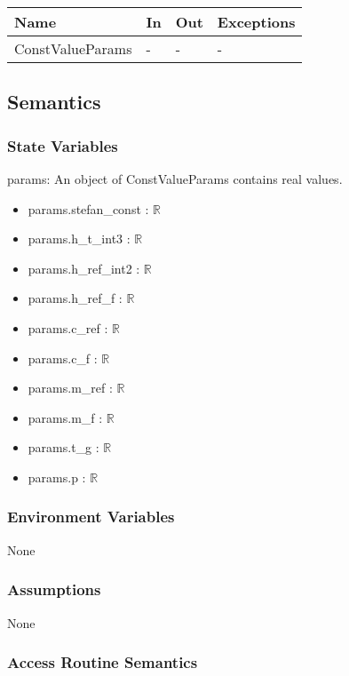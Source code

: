 \documentclass[12pt, titlepage]{article}
\begin{document}
\begin{center}
\begin{tabular}{p{5cm} p{4cm} p{4cm} p{2cm}}
\hline
\textbf{Name} & \textbf{In} & \textbf{Out} & \textbf{Exceptions} \\
\hline
ConstValueParams & - & - & - \\
\hline
\end{tabular}
\end{center}

\subsection{Semantics}

\subsubsection{State Variables}

params: An object of ConstValueParams contains real values. 
\begin{itemize}
 \item params.stefan\_const : $ \mathbb{R}$
 \item params.h\_t\_int3 : $ \mathbb{R}$
 \item params.h\_ref\_int2 : $ \mathbb{R}$
 \item params.h\_ref\_f : $ \mathbb{R}$
 \item params.c\_ref : $ \mathbb{R}$
 \item params.c\_f : $ \mathbb{R}$
 \item params.m\_ref : $ \mathbb{R}$
 \item params.m\_f : $ \mathbb{R}$
 \item params.t\_g : $ \mathbb{R}$
 \item params.p : $ \mathbb{R}$
 
\end{itemize}


\subsubsection{Environment Variables}

None

\subsubsection{Assumptions}

None

\subsubsection{Access Routine Semantics}
\end{document}
